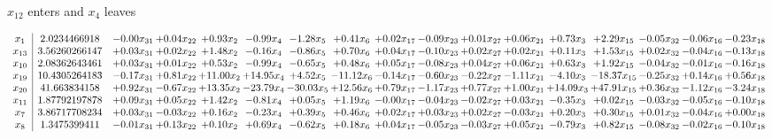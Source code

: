 \documentclass[9pt]{article}
\begin{document}
 $ x_{12} $ enters and $ x_{4} $ leaves 

 \[\begin{array}{c| c c@{\hskip 2pt} c@{\hskip 2pt} c@{\hskip 2pt} c@{\hskip 2pt} c@{\hskip 2pt} c@{\hskip 2pt} c@{\hskip 2pt} c@{\hskip 2pt} c@{\hskip 2pt} c@{\hskip 2pt} c@{\hskip 2pt} c@{\hskip 2pt} c@{\hskip 2pt} c@{\hskip 2pt} c@{\hskip 2pt} }
 x_{1}   &  2.0234466918 & -0.00 x_{31} & +  0.04 x_{22} & +  0.93 x_{2} & -0.99 x_{4} & -1.28 x_{5} & +  0.41 x_{6} & +  0.02 x_{17} & -0.09 x_{23} & +  0.01 x_{27} & +  0.06 x_{21} & +  0.73 x_{3} & +  2.29 x_{15} & -0.05 x_{32} & -0.06 x_{16} & -0.23 x_{18}\\
 x_{13}   &  3.56260266147 & +  0.03 x_{31} & +  0.02 x_{22} & +  1.48 x_{2} & -0.16 x_{4} & -0.86 x_{5} & +  0.70 x_{6} & +  0.04 x_{17} & -0.10 x_{23} & +  0.02 x_{27} & +  0.02 x_{21} & +  0.11 x_{3} & +  1.53 x_{15} & +  0.02 x_{32} & -0.04 x_{16} & -0.13 x_{18}\\
 x_{10}   &  2.08362643461 & +  0.03 x_{31} & +  0.01 x_{22} & +  0.53 x_{2} & -0.99 x_{4} & -0.65 x_{5} & +  0.48 x_{6} & +  0.05 x_{17} & -0.08 x_{23} & +  0.04 x_{27} & +  0.06 x_{21} & +  0.63 x_{3} & +  1.92 x_{15} & -0.04 x_{32} & -0.01 x_{16} & -0.16 x_{18}\\
 x_{19}   &  10.4305264183 & -0.17 x_{31} & +  0.81 x_{22} & + 11.00 x_{2} & + 14.95 x_{4} & +  4.52 x_{5} & -11.12 x_{6} & -0.14 x_{17} & -0.60 x_{23} & -0.22 x_{27} & -1.11 x_{21} & -4.10 x_{3} & -18.37 x_{15} & -0.25 x_{32} & +  0.14 x_{16} & +  0.56 x_{18}\\
 x_{20}   &  41.663834158 & +  0.92 x_{31} & -0.67 x_{22} & + 13.35 x_{2} & -23.79 x_{4} & -30.03 x_{5} & + 12.56 x_{6} & +  0.79 x_{17} & -1.17 x_{23} & +  0.77 x_{27} & +  1.00 x_{21} & + 14.09 x_{3} & + 47.91 x_{15} & +  0.36 x_{32} & -1.12 x_{16} & -3.24 x_{18}\\
 x_{11}   &  1.87792197878 & +  0.09 x_{31} & +  0.05 x_{22} & +  1.42 x_{2} & -0.81 x_{4} & +  0.05 x_{5} & +  1.19 x_{6} & -0.00 x_{17} & -0.04 x_{23} & -0.02 x_{27} & +  0.03 x_{21} & -0.35 x_{3} & +  0.02 x_{15} & -0.03 x_{32} & -0.05 x_{16} & -0.10 x_{18}\\
 x_{7}   &  3.86717708234 & +  0.03 x_{31} & -0.03 x_{22} & +  0.16 x_{2} & -0.23 x_{4} & +  0.39 x_{5} & +  0.46 x_{6} & +  0.02 x_{17} & +  0.03 x_{23} & +  0.02 x_{27} & -0.03 x_{21} & +  0.20 x_{3} & +  0.30 x_{15} & +  0.01 x_{32} & -0.04 x_{16} & +  0.00 x_{18}\\
 x_{8}   &  1.3475399411 & -0.01 x_{31} & +  0.13 x_{22} & +  0.10 x_{2} & +  0.69 x_{4} & -0.62 x_{5} & +  0.18 x_{6} & +  0.04 x_{17} & -0.05 x_{23} & -0.03 x_{27} & +  0.05 x_{21} & -0.79 x_{3} & +  0.82 x_{15} & -0.08 x_{32} & -0.02 x_{16} & -0.10 x_{18}\\

\end{array}\]
\end{document}
